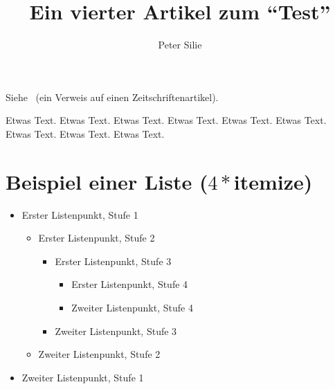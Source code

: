 \documentclass{dtk2}
\author{Peter Silie}
\begin{document}
\title{Ein vierter Artikel zum "`Test"'}

\maketitle

Siehe~\cite{Niepraschk-dtk15.1:niepraschk.voss:texlivelist} (ein Verweis auf
einen Zeitschriftenartikel).

Etwas Text. Etwas Text. Etwas Text. Etwas Text. Etwas Text. Etwas Text.
Etwas Text. Etwas Text. Etwas Text.

\section{Beispiel einer Liste ($4*$itemize)}

\begin{itemize}
  \item Erster Listenpunkt, Stufe 1
  \begin{itemize}
    \item Erster Listenpunkt, Stufe 2
    \begin{itemize}
      \item Erster Listenpunkt, Stufe 3
      \begin{itemize}
        \item Erster Listenpunkt, Stufe 4
        \item Zweiter Listenpunkt, Stufe 4
      \end{itemize}
      \item Zweiter Listenpunkt, Stufe 3
    \end{itemize}
    \item Zweiter Listenpunkt, Stufe 2
  \end{itemize}
  \item Zweiter Listenpunkt, Stufe 1
\end{itemize}

\printbibliography
\end{document}
